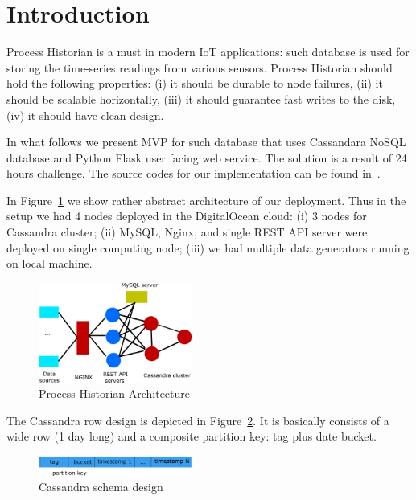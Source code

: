 \section{Introduction}
\label{section:introduction}

Process Historian is a must in modern IoT applications:
such database is used for storing the time-series readings
from various sensors. Process Historian should hold
the following properties: (i) it should be durable to node failures,
(ii) it should be scalable horizontally, (iii) it should guarantee 
fast writes to the disk, (iv) it should have clean design.

In what follows we present MVP for such database that uses 
Cassandara NoSQL database and Python Flask user facing 
web service. The solution is a result of 24 hours challenge.
The source codes for our implementation can be found 
in~\cite{git}.


In Figure~\ref{fig:arch} we show rather abstract architecture of our deployment.
Thus in the setup we had 4 nodes deployed in the DigitalOcean
cloud: (i) 3 nodes for Cassandra cluster; (ii) MySQL, Nginx,
and single REST API server were deployed on single computing node;
(iii) we had multiple data generators running on local machine.

\begin{figure}[!hbt]\centering
  \includegraphics[width=0.45\textwidth]{graphics/arch.png}
  \caption{Process Historian Architecture}
  \label{fig:arch}
\end{figure}

The Cassandra row design is depicted in Figure~\ref{fig:schema}.
It is basically consists of a wide row (1 day long) and a composite
partition key: tag plus date bucket. 

\begin{figure}[!hbt]\centering
  \includegraphics[width=0.45\textwidth]{graphics/schema.png}
  \caption{Cassandra schema design}
  \label{fig:schema}
\end{figure}

